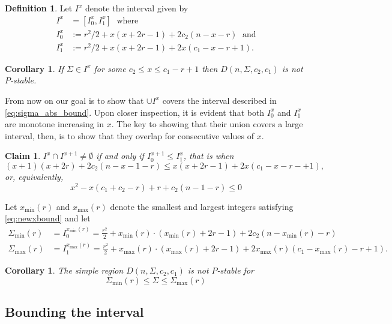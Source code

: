 \documentclass[11pt]{elsarticle}
\theoremstyle{plain}
\newtheorem{corollary}[theorem]{Corollary}
\newtheorem{claim}[theorem]{Claim}
\theoremstyle{definition}
\newtheorem{definition}[theorem]{Definition}
\newcommand{\Smax}[1][r]{\Sigma_{\max}(#1)}
\newcommand{\amax}[1][r]{x_{\max}(#1)}
\newcommand{\Smin}[1][r]{\Sigma_{\min}(#1)}
\newcommand{\amin}[1][r]{x_{\min}(#1)}
\begin{document}
\begin{definition}\label{eq:Ix}
Let $I^x$ denote the interval given by
\begin{align*}
I^x &= [I^x_0, I^x_1] \; \mbox{ where}\\
I^x_0 &:=r^2/2 + x(x+2r-1) + 2c_2(n-x-r) \; \mbox{ and}\\
I^x_1 &:= r^2/2 + x(x+2r-1) + 2x(c_1 - x-r+1).
\end{align*}
\end{definition}

\begin{corollary}\label{cor:sigmaint} If $\Sigma \in I^x$ for some $c_2 \leq x \leq c_1-r+1$ then $D(n,\Sigma,c_2,c_1)$ is not $P$-stable.
\end{corollary}

From now on our goal is to show that $\cup I^x$ covers the interval described in \eqref{eq:sigma_abs_bound}. Upon closer inspection, it is evident that both $I^x_0$ and $I^x_1$ are monotone increasing in $x$. The key to showing that their union covers a large interval, then, is to show that they overlap for consecutive values of $x$.

\begin{claim}
    $I^x \cap I^{x+1} \neq \emptyset$ if and only if $I^{x+1}_0 \leq I^{x}_1$, that is when
    \[ (x+1)(x+2r)+2c_2(n-x-1-r) \leq x(x+2r-1) + 2x(c_1-x-r-+1),\]
    or, equivalently,
    \begin{equation}\label{eq:newxbound}
        x^2-x(c_1+c_2-r)+r + c_2(n-1-r) \leq 0
    \end{equation}
\end{claim}
\noindent Let $\amin$ and $\amax$ denote the smallest and largest integers satisfying \eqref{eq:newxbound} and let
\begin{align*}
    \Smin &= I^{\amin}_0 = \frac{r^2}{2} +  \amin \cdot (\amin +2r-1)+ 2 c_2 (n-\amin - r) \\
\Smax &= I^{\amax}_1 = \frac{r^2}{2} +  \amax \cdot (\amax +2r-1)+ 2 \amax (c_1-\amax - r+1).
\end{align*}

\begin{corollary}
The simple region $D(n,\Sigma,c_2,c_1)$ is not $P$-stable for
\[ \Smin \leq \Sigma \leq \Smax \]
\end{corollary}


\subsection{Bounding the interval}
\end{document}
